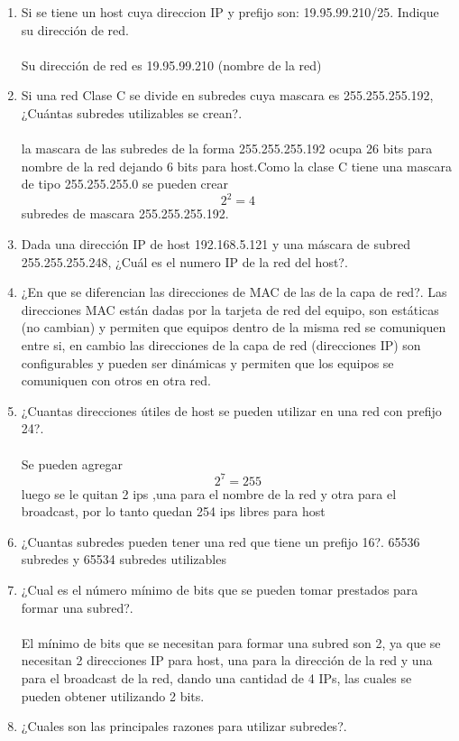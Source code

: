 \documentclass{udparticle}
\begin{document}
\begin{enumerate}
\item Si se tiene un host cuya direccion IP y prefijo son: 19.95.99.210/25. Indique su dirección de red.\\\\
Su dirección de red es 19.95.99.210 (nombre de la red)

\item Si una red Clase C se divide en subredes cuya mascara es
255.255.255.192, ¿Cuántas subredes utilizables se crean?.\\\\
la mascara de las subredes de la forma 255.255.255.192 ocupa 
26 bits para nombre de la red dejando 6 bits para host.Como la  %
clase C tiene una mascara de tipo 255.255.255.0 se pueden crear
\[2^2=4\]
subredes de mascara 255.255.255.192.

\item Dada una dirección IP de host 192.168.5.121 y una máscara de 
subred 255.255.255.248, ¿Cuál es el numero IP de la red del host?.
\item ¿En que se diferencian las direcciones de MAC de las de la capa de red?.
Las direcciones MAC están dadas por la tarjeta de red del equipo, son estáticas (no cambian) y permiten que equipos dentro de la misma red se comuniquen entre si, en cambio las direcciones de la capa de red (direcciones IP) son configurables y pueden ser dinámicas y permiten que los equipos se comuniquen con otros en otra red.
\item ¿Cuantas direcciones útiles de host se pueden utilizar en una red con prefijo 24?.\\\\
Se pueden agregar \[2^7=255\]
luego se le quitan 2 ips ,una para el nombre de la red  y otra para el 
broadcast, por lo tanto quedan 254 ips libres para host
\item ¿Cuantas subredes pueden tener una red que tiene un prefijo 16?.
	65536 subredes y 65534 subredes utilizables %
\item ¿Cual es el número mínimo de bits que se pueden tomar prestados para formar una subred?.\\\\
El mínimo de bits que se necesitan para formar una subred son 2, ya que se necesitan 2 direcciones IP para host, una para la dirección de la red y una para el  broadcast de la red, dando una cantidad de 4 IPs, las cuales se pueden obtener utilizando 2 bits.
\item ¿Cuales son las principales razones para utilizar subredes?.\\\\

\end{enumerate}
\end{document}
